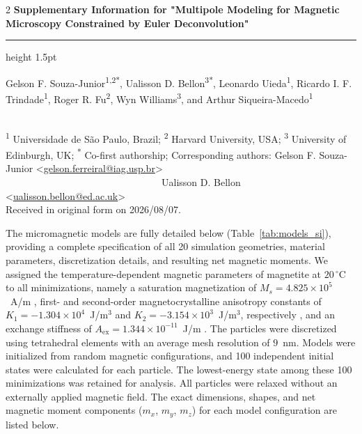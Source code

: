 \documentclass[11pt,a4paper]{article}
\makeatletter
\newcommand{\Title}{Supplementary Information for "Multipole Modeling for Magnetic Microscopy Constrained by Euler Deconvolution"}
\newcommand{\SubmittedOn}{2026/08/07}
\newcommand{\PublishedOn}{2026/08/07}
\newcommand{\Authors}{%
Gelson F. Souza-Junior\textsuperscript{1,2*},
Ualisson D. Bellon\textsuperscript{3*},
Leonardo Uieda\textsuperscript{1},
Ricardo I. F. Trindade\textsuperscript{1},
Roger R. Fu\textsuperscript{2},
Wyn Williams\textsuperscript{3}, and
Arthur Siqueira-Macedo\textsuperscript{1}
}
\newcommand{\Emailgelson}{gelson.ferreiral@iag.usp.br}
\newcommand{\Emailualisson}{ualisson.bellon@ed.ac.uk}
\newcommand{\Corresponding}{%
  Corresponding authors: Gelson F. Souza-Junior <\href{mailto:\Emailgelson}{\Emailgelson}> \\
~~~~~~~~~~~~~~~~~~~~~~~~~~~~~~~~Ualisson D. Bellon <\href{mailto:\Emailualisson}{\Emailualisson}>
}
\newcommand{\Affiliations}{%
  \textsuperscript{1} Universidade de São Paulo, Brazil;
  \textsuperscript{2} Harvard University, USA;
  \textsuperscript{3} University of Edinburgh, UK;
  \textsuperscript{*} Co-first authorship;
}
\makeatother
\begin{document}
\thispagestyle{plain}

\begin{FlushLeft}
  \begin{spacing}{2}
    {\LARGE\bfseries \Title}
  \end{spacing}
  {\color{lightgray}\hrule height 1.5pt}
  \vspace{0.3cm}
  \Authors
  \\[0.2cm]
  {\footnotesize \Affiliations}
  \newline
  {\footnotesize \Corresponding}
  \\[0.2cm]
  {\footnotesize
    Received in original form on \SubmittedOn.
  }
\end{FlushLeft}

\newpage
The micromagnetic models are fully detailed below (Table~\ref{tab:models_si}), providing a complete specification of all 20 simulation geometries, material parameters, discretization details, and resulting net magnetic moments. We assigned the temperature-dependent magnetic parameters of magnetite at $20\,^\circ\mathrm{C}$ to all minimizations, namely a saturation magnetization of $M_s = 4.825 \times 10^5$~A/m \citep{Pauthenet-1951}, first- and second-order magnetocrystalline anisotropy constants of $K_1 = -1.304 \times 10^4$~J/m$^3$ and $K_2 = -3.154 \times 10^3$~J/m$^3$, respectively \citep{Fletcher-1974}, and an exchange stiffness of $A_{\mathrm{ex}} = 1.344 \times 10^{-11}$~J/m \citep{Heider-1988}. The particles were discretized using tetrahedral elements with an average mesh resolution of $9$~nm. Models were initialized from random magnetic configurations, and 100 independent initial states were calculated for each particle. The lowest-energy state among these 100 minimizations was retained for analysis. All particles were relaxed without an externally applied magnetic field. The exact dimensions, shapes, and net magnetic moment components ($m_x$, $m_y$, $m_z$) for each model configuration are listed below.
\end{document}
